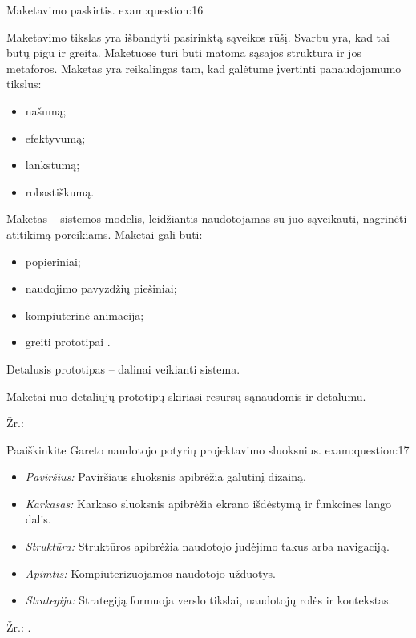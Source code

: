 \begin{question}{%
  Maketavimo paskirtis.
  }{exam:question:16}

  Maketavimo tikslas yra išbandyti pasirinktą sąveikos rūšį. Svarbu yra,
  kad tai būtų pigu ir greita. Maketuose turi būti matoma sąsajos struktūra
  ir jos metaforos. Maketas yra reikalingas tam, kad galėtume įvertinti
  panaudojamumo tikslus:
  \begin{itemize}
    \item našumą;
    \item efektyvumą;
    \item lankstumą;
    \item robastiškumą.
  \end{itemize}

  Maketas – sistemos modelis, leidžiantis naudotojamas su juo sąveikauti,
  nagrinėti atitikimą poreikiams. Maketai gali būti:
  \begin{itemize}
    \item popieriniai;
    \item naudojimo pavyzdžių piešiniai;
    \item kompiuterinė animacija;
    \item greiti prototipai .
  \end{itemize}
  
  Detalusis prototipas – dalinai veikianti sistema.

  Maketai nuo detaliųjų prototipų skiriasi resursų sąnaudomis ir detalumu.

  Žr.: \cite[47--]{skaidres-6}
\end{question}


\begin{question}{%
  Paaiškinkite Gareto naudotojo potyrių projektavimo sluoksnius.
  }{exam:question:17}
  
  \begin{itemize}
    \item \emph{Paviršius:} Paviršiaus sluoksnis apibrėžia galutinį
      dizainą.
    \item \emph{Karkasas:} Karkaso sluoksnis apibrėžia ekrano išdėstymą
      ir funkcines lango dalis.
    \item \emph{Struktūra:} Struktūros apibrėžia naudotojo judėjimo
      takus arba navigaciją.
    \item \emph{Apimtis:} Kompiuterizuojamos naudotojo užduotys.
    \item \emph{Strategija:} Strategiją formuoja verslo tikslai, naudotojų
      rolės ir kontekstas.
  \end{itemize}
  Žr.: \cite[9-14]{skaidres-7}.
\end{question}

